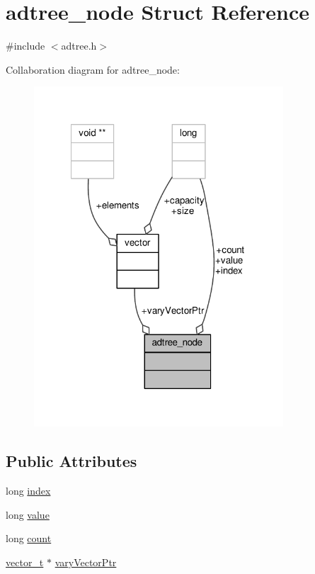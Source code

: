 \hypertarget{structadtree__node}{\section{adtree\-\_\-node Struct Reference}
\label{structadtree__node}
}


{\ttfamily \#include $<$adtree.\-h$>$}



Collaboration diagram for adtree\-\_\-node\-:
\nopagebreak
\begin{figure}[H]
\begin{center}
\leavevmode
\includegraphics[width=264pt]{structadtree__node__coll__graph}
\end{center}
\end{figure}
\subsection*{Public Attributes}
\begin{DoxyCompactItemize}
\item 
long \hyperlink{structadtree__node_a822033e8f2411f77684f810697782cab}{index}
\item 
long \hyperlink{structadtree__node_adc8e3d5e035961a09058d2a1b3e27695}{value}
\item 
long \hyperlink{structadtree__node_a0bafd7d0137d28c03ca2400cba80784b}{count}
\item 
\hyperlink{vector_8h_a5a1bca6fa9a3f18a2897623094d918da}{vector\-\_\-t} $\ast$ \hyperlink{structadtree__node_a04437090808b3b37786f9d804844185d}{vary\-Vector\-Ptr}
\end{DoxyCompactItemize}


